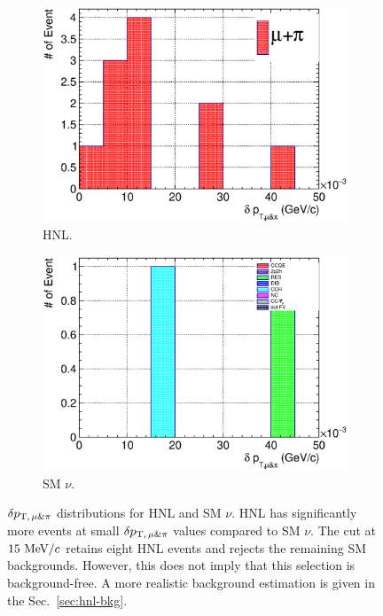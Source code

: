         \begin{figure}[!htb]
           \centering
           \begin{subfigure}{0.45\textwidth}
                \includegraphics[width=\textwidth]{figures/hnl/hnl_sfgmu_mpdpt_stack_al9_300_aftmupikin.eps}
                \caption{HNL.}
                \label{fig:hnl-mupidpt}
           \end{subfigure}
           \begin{subfigure}{0.45\textwidth}
                \includegraphics[width=\textwidth]{figures/hnl/hnl_sfgmu_mpdpt_stack_al9_SM_aftmupikin.eps}
                \caption{SM $\nu$.}
                \label{fig:sm-mupidpt}
           \end{subfigure}
           \caption{$\delta p_{\textrm{T},\,\mu\&\pi}$ distributions for HNL and SM $\nu$. HNL has significantly more events at small $\delta p_{\textrm{T},\,\mu\&\pi}$ values compared to SM $\nu$. The cut at $15~\textrm{MeV}/c$ retains eight HNL events and rejects the remaining SM backgrounds. However,  this does not imply that this selection is background-free. A more realistic background estimation is given in the Sec.~\ref{sec:hnl-bkg}.}
           \label{fig:mmupi-dpt}
        \end{figure}

